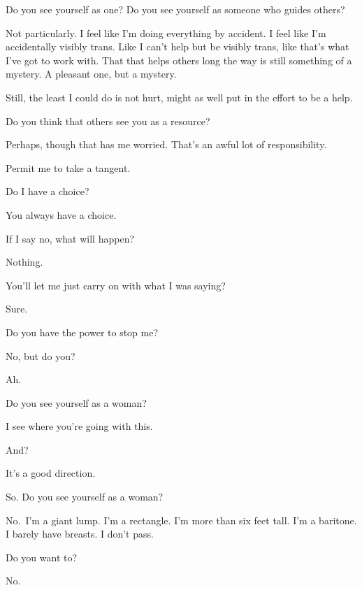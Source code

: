 \begin{ally}
Do you see yourself as one? Do you see yourself as someone who guides others?
\end{ally}
Not particularly. I feel like I'm doing everything by accident. I feel like I'm accidentally visibly trans. Like I can't help but be visibly trans, like that's what I've got to work with. That that helps others long the way is still something of a mystery. A pleasant one, but a mystery.

Still, the least I could do is not hurt, might as well put in the effort to be a help.

\begin{ally}
Do you think that others see you as a resource?
\end{ally}
Perhaps, though that has me worried. That's an awful lot of responsibility.

\begin{ally}
Permit me to take a tangent.
\end{ally}
Do I have a choice?

\begin{ally}
You always have a choice.
\end{ally}
If I say no, what will happen?

\begin{ally}
Nothing.
\end{ally}
You'll let me just carry on with what I was saying?

\begin{ally}
Sure.
\end{ally}
Do you have the power to stop me?

\begin{ally}
No, but do you?
\end{ally}
Ah.
\newpage

\begin{ally}
Do you see yourself as a woman?
\end{ally}
I see where you're going with this.

\begin{ally}
And?
\end{ally}
It's a good direction.

\begin{ally}
So. Do you see yourself as a woman?
\end{ally}
No.~I'm a giant lump. I'm a rectangle. I'm more than six feet tall. I'm a baritone. I barely have breasts. I don't pass.

\begin{ally}
Do you want to?
\end{ally}
No.

